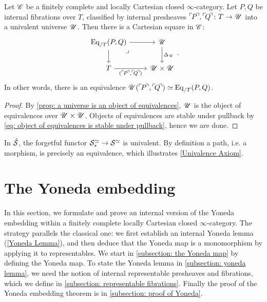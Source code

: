 \documentclass[twoside,a4paper,11pt]{amsart}
\begin{document}
\begin{prop}[Univalence]\label{Univalence Axiom}
    Let $\mathscr{C}$ be a finitely complete and locally Cartesian closed $\infty$-category. Let $P,Q$ be internal fibrations over $T$, classified by internal presheaves $\corner{P}, \corner{Q} \colon T \to \U$ into a univalent universe $\mathscr{U}$. Then there is a Cartesian square in $\mathscr{C}$:
\[\begin{tikzcd}
    {\Eq_{/T}(P,Q)} \arrow[r] \arrow[d] \arrow[dr, phantom, "\lrcorner"{anchor=center, pos=0.125}] & \U \arrow[d, "\Delta_{\U}"] \\
    T \arrow[r, "{(\corner{P},\corner{Q})}"'] & {\U \times \U}
\end{tikzcd}.\]
   In other words, there is an equivalence $\U(\corner{P},\corner{Q})\simeq\Eq_{/T}(P,Q)$.
\end{prop}
\begin{proof}
    By \cref{prop: a universe is an object of equivalences}, $\mathscr{U}$ is the object of equivalences over $\mathscr{U}\times \mathscr{U}$. Objects of equivalences are stable under pullback by \eqref{eq: object of equivalences is stable under pullback}, hence we are done.
\end{proof}
\begin{example}\label{example: universe in spaces}
    In $\hat{\mathcal{S}}$, the forgetful functor $\mathcal{S}^\simeq_\ast\to\mathcal{S}^\simeq$ is univalent. By definition a path, i.e. a morphism, is precisely an equivalence, which illustrates \cref{Univalence Axiom}.
\end{example}

\section{The Yoneda embedding}\label{section : Yoneda}
In this section, we formulate and prove an internal version of the Yoneda embedding within a finitely complete locally Cartesian closed $\infty$-category. The strategy parallels the classical one: we first establish an internal Yoneda lemma (\cref{Yoneda Lemma}), and then deduce that the Yoneda map is a monomorphism by applying it to representables. We start in \cref{subsection: the Yoneda map} by defining the Yoneda map. To state the Yoneda lemma in \cref{subsection: yoneda lemma}, we need the notion of internal representable presheaves and fibrations, which we define in \cref{subsection: representable fibrations}. Finally the proof of the Yoneda embedding theorem is in \cref{subsection: proof of Yoneda}.
\end{document}
